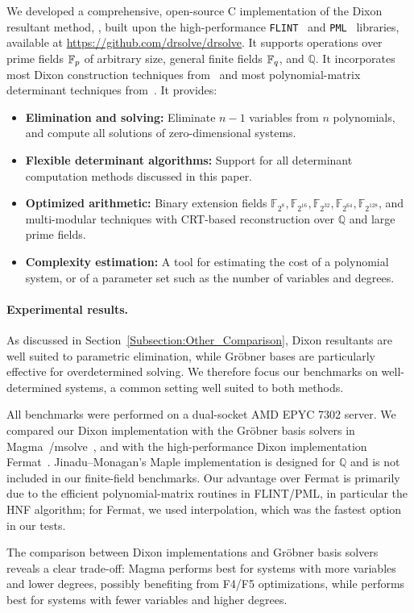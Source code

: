 We developed a comprehensive, open-source C implementation of the Dixon resultant method, \drsolve, built upon the high-performance \texttt{FLINT}~\cite{flint} and \texttt{PML}~\cite{pml,HyunNeigerSchost2019} libraries, available at \url{https://github.com/drsolve/drsolve}. It supports operations over prime fields $\mathbb{F}_p$ of arbitrary size, general finite fields $\mathbb{F}_q$, and $\mathbb{Q}$. It incorporates most Dixon construction techniques from~\cite{Lewis2017,Zhao2005extfast,JinaduMonagan2025} and most polynomial-matrix determinant techniques from~\cite{DBLP:journals/jc/LabahnNZ17,DBLP:journals/jsc/Huang23,HorowitzSahni1975,Li2007symbolic}. It provides:

\begin{itemize}
	\item \textbf{Elimination and solving:} Eliminate $n-1$ variables from $n$ polynomials, and compute all solutions of zero-dimensional systems.
	\item \textbf{Flexible determinant algorithms:} Support for all determinant computation methods discussed in this paper.
	\item \textbf{Optimized arithmetic:} Binary extension fields $\mathbb{F}_{2^{8}},\mathbb{F}_{2^{16}},\mathbb{F}_{2^{32}},\mathbb{F}_{2^{64}},\mathbb{F}_{2^{128}}$, and multi-modular techniques with CRT-based reconstruction over $\mathbb{Q}$ and large prime fields.
	\item \textbf{Complexity estimation:} A tool for estimating the cost of a polynomial system, or of a parameter set such as the number of variables and degrees.
\end{itemize}


\paragraph{Experimental results.}
As discussed in Section~\ref{Subsection:Other_Comparison}, Dixon resultants are well suited to parametric elimination, while Gr\"obner bases are particularly effective for overdetermined solving. We therefore focus our benchmarks on well-determined systems, a common setting well suited to both methods.

All benchmarks were performed on a dual-socket AMD EPYC 7302 server. We compared our Dixon implementation with the Gr\"obner basis solvers in Magma~\cite{magma}/msolve~\cite{msolve}, and with the high-performance Dixon implementation Fermat~\cite{fermat}. Jinadu--Monagan's Maple implementation is designed for $\mathbb{Q}$ and is not included in our finite-field benchmarks. Our advantage over Fermat is primarily due to the efficient polynomial-matrix routines in FLINT/PML, in particular the HNF algorithm; for Fermat, we used interpolation, which was the fastest option in our tests. 

The comparison between Dixon implementations and Gr\"obner basis solvers reveals a clear trade-off: Magma performs best for systems with more variables and lower degrees, possibly benefiting from F4/F5 optimizations, while \drsolve performs best for systems with fewer variables and higher degrees.
